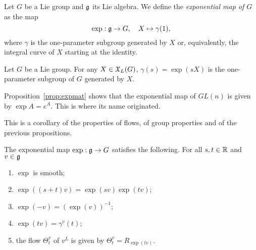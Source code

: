 \begin{definition}
	Let $G$ be a Lie group and $\mathfrak{g}$ its Lie algebra.
	We define the \emph{exponential map of $G$} as the map
	\begin{equation}
		\exp: \mathfrak{g} \to G , \quad X \mapsto \gamma(1),
	\end{equation}
	where $\gamma$ is the one-parameter subgroup generated by $X$ or, equivalently, the integral curve of $X$ starting at the identity.
\end{definition}

\begin{exercise}
	Let $G$ be a Lie group. For any $X\in\mathfrak{X}_L(G)$, $\gamma(s) =\exp(sX)$ is the one-parameter subgroup of $G$ generated by $X$.
\end{exercise}

\begin{example}
	Proposition~\ref{prop:expmat} shows that the exponential map of $GL(n)$ is given by $\exp A = e^A$.
	This is where its name originated.
\end{example}

This is a corollary of the properties of flows, of group properties and of the previous propositions.
\begin{proposition}
	The exponential map $\exp: \mathfrak{g} \to G$ satisfies the following.
	For all $s,t\in\mathbb{R}$ and $v\in\mathfrak{g}$
	\begin{enumerate}
		\item $\exp$ is smooth;
		\item $\exp((s+t)v) = \exp(sv)\exp(tv)$;
		\item $\exp(-v) = (\exp(v))^{-1}$;
		\item $\exp(tv) =\gamma^v(t)$;
		\item the flow $\Theta_t^v$ of $v^L$ is given by $\Theta_t^v=R_{\exp(tv)}$.
	\end{enumerate}
\end{proposition}

